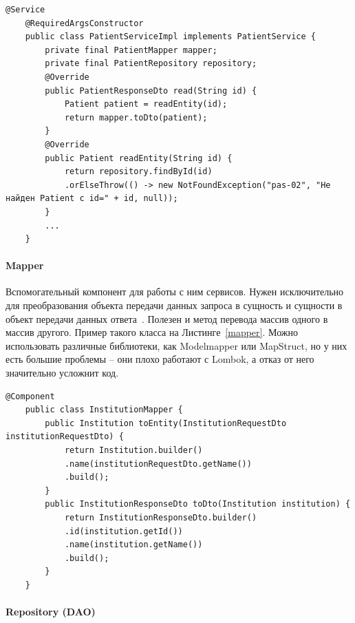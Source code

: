 \documentclass[a4paper,article]{article}
\begin{document}
\begin{sloppypar}
   \begin{lstlisting}[label=service,caption=Пример класса слоя бизнес-логики]
    @Service
    @RequiredArgsConstructor
    public class PatientServiceImpl implements PatientService {
        private final PatientMapper mapper;
        private final PatientRepository repository;
        @Override
        public PatientResponseDto read(String id) {
            Patient patient = readEntity(id);
            return mapper.toDto(patient);
        }
        @Override
        public Patient readEntity(String id) {
            return repository.findById(id)
            .orElseThrow(() -> new NotFoundException("pas-02", "Не найден Patient с id=" + id, null));
        }
        ...
    }
    \end{lstlisting}

    \paragraph{Mapper}\label{Реализация. Сервер. Mapper}

    Вспомогательный компонент для работы с ним сервисов. Нужен исключительно для преобразования объекта передачи данных запроса в сущность и сущности в объект передачи данных ответа~\cite{baeldungbook, springguide, cleanarch}. Полезен и метод перевода массив одного в массив другого. Пример такого класса на Листинге~\ref{mapper}. Можно использовать различные библиотеки, как Modelmapper или MapStruct, но у них есть большие проблемы -- они плохо работают с Lombok, а отказ от него значительно усложнит код.

   \begin{lstlisting}[label=mapper,caption=Пример класса-маппера]
    @Component
    public class InstitutionMapper {
        public Institution toEntity(InstitutionRequestDto institutionRequestDto) {
            return Institution.builder()
            .name(institutionRequestDto.getName())
            .build();
        }
        public InstitutionResponseDto toDto(Institution institution) {
            return InstitutionResponseDto.builder()
            .id(institution.getId())
            .name(institution.getName())
            .build();
        }
    }
    \end{lstlisting}

    \paragraph{Repository (DAO)}\label{Реализация. Сервер. Repository}


\end{sloppypar}
\end{document}
